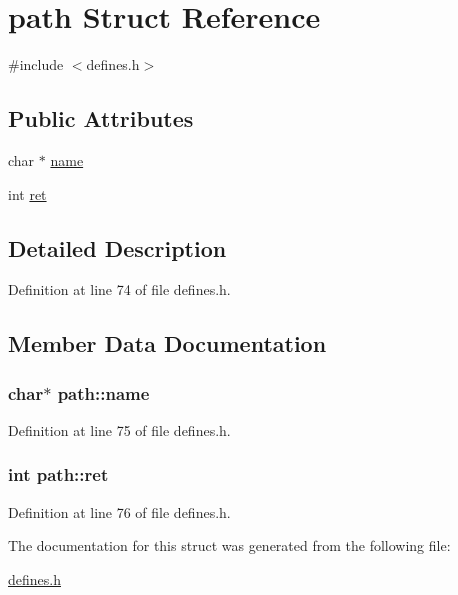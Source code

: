 \hypertarget{structpath}{\section{path Struct Reference}
\label{structpath}
}


{\ttfamily \#include $<$defines.\-h$>$}

\subsection*{Public Attributes}
\begin{DoxyCompactItemize}
\item 
char $\ast$ \hyperlink{structpath_a90b4e69e79ffcab58317188012e7da1f}{name}
\item 
int \hyperlink{structpath_a458da1607fd2ddce96c794a6876ddd6f}{ret}
\end{DoxyCompactItemize}


\subsection{Detailed Description}


Definition at line 74 of file defines.\-h.



\subsection{Member Data Documentation}
\hypertarget{structpath_a90b4e69e79ffcab58317188012e7da1f}{
\subsubsection[{name}]{\setlength{\rightskip}{0pt plus 5cm}char$\ast$ path\-::name}}\label{structpath_a90b4e69e79ffcab58317188012e7da1f}


Definition at line 75 of file defines.\-h.

\hypertarget{structpath_a458da1607fd2ddce96c794a6876ddd6f}{
\subsubsection[{ret}]{\setlength{\rightskip}{0pt plus 5cm}int path\-::ret}}\label{structpath_a458da1607fd2ddce96c794a6876ddd6f}


Definition at line 76 of file defines.\-h.



The documentation for this struct was generated from the following file\-:\begin{DoxyCompactItemize}
\item 
\hyperlink{defines_8h}{defines.\-h}\end{DoxyCompactItemize}
